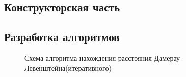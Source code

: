 \documentclass[a4paper,12pt]{report}
\begin{document}
    \begin{center}
    	\newpage
        \section{Конструкторская часть}
        \subsection{Разработка алгоритмов}
        \begin{figure}[h]
			\caption{Схема алгоритма нахождения расстояния Дамерау-Левенштейна(итеративного)}
			\label{ris:image}
		\end{figure}
        \begin{figure}[h]

\end{figure}
\end{center}
\end{document}
